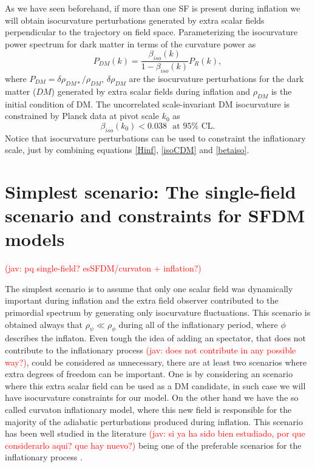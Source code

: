 \documentclass[amssymb,twocolumn,prd,nofootinbib,showpacs]{revtex4-1}
\newcommand{\jav}[1]{\textcolor{red}{(jav: #1)}}
\begin{document}
As we have seen beforehand, if more than one SF is present during inflation we will obtain isocurvature 
perturbations generated by extra scalar fields perpendicular to the trajectory on field space. 
%
Parameterizing the isocurvature power spectrum for dark matter in terms of the curvature power as
\begin{equation}\label{isoCDM}
P_{DM}(k) = \frac{\beta_{iso}(k)}{1-\beta_{iso}(k)}P_R(k),
\end{equation}
where $P_{DM}=\delta \rho_{DM*}/\rho_{DM}$, $\delta\rho_{DM}$ are the isocurvature 
perturbations for the dark matter ($DM$) generated by extra scalar fields during inflation and $\rho_{DM}$ 
is the initial condition of DM. 
The uncorrelated scale-invariant DM isocurvature is constrained by Planck data \cite{const1,const2} at pivot scale $k_0$ as
\begin{equation}\label{betaiso}
\beta_{iso}(k_0)<0.038 \ \ \ \text{at $95\%$ CL}.
\end{equation}
Notice that isocurvature perturbations can be used to constraint the inflationary scale, 
just by combining equations \eqref{Hinf}, \eqref{isoCDM} and \eqref{betaiso}.
%
%
%
%
%
%
\section{Simplest scenario: The single-field scenario and constraints for SFDM models}\label{simplest}
 \jav{pq single-field? esSFDM/curvaton + inflation?}

The simplest scenario is to assume that only one scalar field was dynamically important during inflation and 
the extra field observer contributed to the primordial spectrum by generating only isocurvature fluctuations. 
%
This scenario is obtained always that $\rho_{\psi}\ll \rho_{\phi}$ during all of the inflationary period, 
where $\phi$ describes the inflaton. 
%
Even tough the idea of adding an spectator, that does not contribute to the inflationary process 
\jav{does not contribute in any possible way?}, could be considered as unnecessary, there are at least 
two scenarios where  extra degrees of freedom can be important. 
%
One is by considering an scenario where this extra scalar field can be used as a DM candidate, 
in such case we will have isocurvature constraints for our model. On the other hand we have the so 
called curvaton inflationary model, where this new field is responsible for the majority of the adiabatic 
perturbations produced during inflation. This scenario has been well studied in the literature \jav{si ya ha sido bien estudiado,
por que considerarlo aqui? que hay nuevo?} being 
one of the preferable scenarios for the inflationary process \cite{curvaton15,curvaton16}. 
\end{document}
